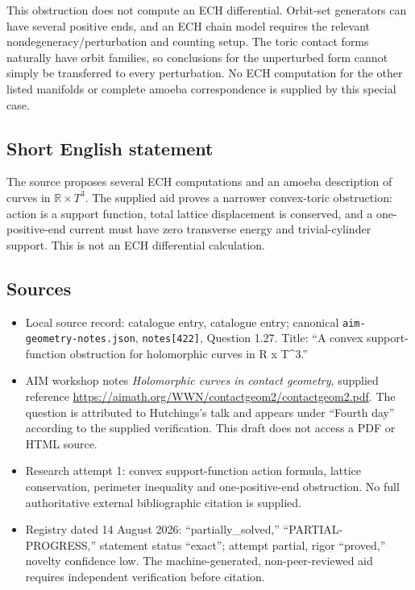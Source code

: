 \documentclass[11pt]{article}
\begin{document}
This obstruction does not compute an ECH differential. Orbit-set generators can have several positive ends, and an ECH chain model requires the relevant nondegeneracy/perturbation and counting setup. The toric contact forms naturally have orbit families, so conclusions for the unperturbed form cannot simply be transferred to every perturbation. No ECH computation for the other listed manifolds or complete amoeba correspondence is supplied by this special case.
\subsection{Short English statement}
The source proposes several ECH computations and an amoeba description of curves in \(\mathbb R\times T^3\). The supplied aid proves a narrower convex-toric obstruction: action is a support function, total lattice displacement is conserved, and a one-positive-end current must have zero transverse energy and trivial-cylinder support. This is not an ECH differential calculation.
\subsection{Sources}
\begin{itemize}
\item Local source record: catalogue entry, catalogue entry; canonical \texttt{aim-geometry-notes.json}, \texttt{notes[422]}, Question 1.27. Title: ``A convex support-function obstruction for holomorphic curves in R x T\^{}3.''
\item AIM workshop notes \emph{Holomorphic curves in contact geometry}, supplied reference \url{https://aimath.org/WWN/contactgeom2/contactgeom2.pdf}. The question is attributed to Hutchings's talk and appears under ``Fourth day'' according to the supplied verification. This draft does not access a PDF or HTML source.
\item Research attempt 1: convex support-function action formula, lattice conservation, perimeter inequality and one-positive-end obstruction. No full authoritative external bibliographic citation is supplied.
\item Registry dated 14 August 2026: ``partially\_solved,'' ``PARTIAL-PROGRESS,'' statement status ``exact''; attempt partial, rigor ``proved,'' novelty confidence low. The machine-generated, non-peer-reviewed aid requires independent verification before citation.
\end{itemize}
\end{document}
